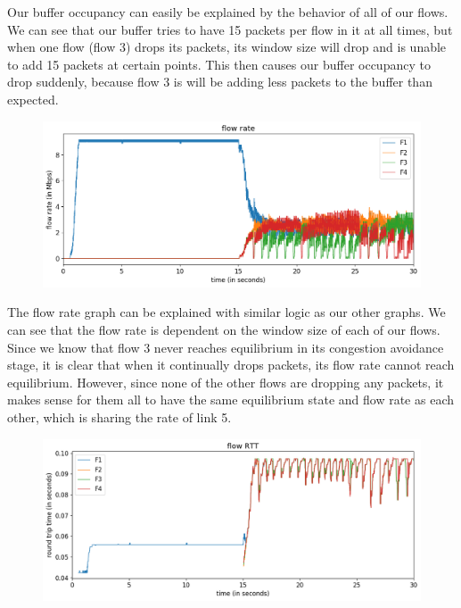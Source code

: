 \documentclass{article}
\begin{document}
Our buffer occupancy can easily be explained by the behavior of all of our flows. We can see that our buffer tries to have 15 packets per flow in it at all times, but when one flow (flow 3) drops its packets, its window size will drop and is unable to add 15 packets at certain points. This then causes our buffer occupancy to drop suddenly, because flow 3 is will be adding less packets to the buffer than expected.

\begin{figure}[H]
\centering
\includegraphics[width = \textwidth]{"test_case5_fast flow rate"}
\end{figure}

The flow rate graph can be explained with similar logic as our other graphs. We can see that the flow rate is dependent on the window size of each of our flows. Since we know that flow 3 never reaches equilibrium in its congestion avoidance stage, it is clear that when it continually drops packets, its flow rate cannot reach equilibrium. However, since none of the other flows are dropping any packets, it makes sense for them all to have the same equilibrium state and flow rate as each other, which is sharing the rate of link 5.

\begin{figure}[H]
\centering
\includegraphics[width = \textwidth]{"test_case5_fast flow RTT"}
\end{figure}
\end{document}
